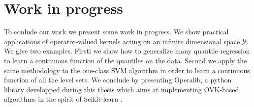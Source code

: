 
\chapter{Work in progress}
\label{ch:Perspectives}
\bigskip
\begin{justify}
    To conlude our work we present some work in progress. We show practical
    applications of operator-valued kernels acting on an infinite dimensional
    space $\mathcal{Y}$. We give two examples. Firsti we show how to generalize
    many quantile regression to learn a continuous function of the quantiles on
    the data. Second we apply the same methodology to the one-class SVM
    algorithm in order to learn a continuous function of all the level sets. We
    conclude by presenting Operalib, a python library developped during this
    thesis which aims at implementing \acs{OVK}-based algorithms in the spirit
    of Scikit-learn \citep{pedregosa2011scikit}.
\end{justify}
\minitoc




